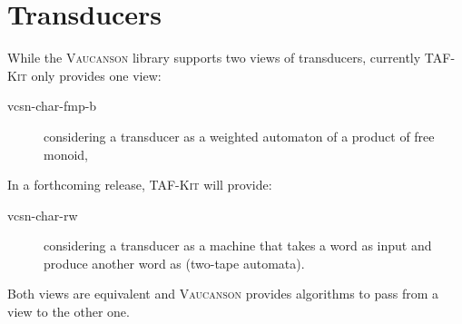 \documentclass[a4paper]{report}
\newcommand{\tafkit}{\textsc{TAF-Kit}\xspace}
\newcommand{\Vauc}{\textsc{Vaucanson}\xspace}
\newenvironment{fnsection}[1]{%
  \renewcommand{\item}[3]{\texttt{##1} \var{##2} & ##3\\}

  \tabularx{\textwidth}{|l|X|}%
    \hline\multicolumn{2}{|c|}{#1} \\\hline%
  }{%
  \endtabularx%
}
\begin{document}

\newpage
\section{Transducers}
\label{sec:vcsn-char-fmp-b}

While the \Vauc library supports two views of transducers, currently
\tafkit only provides one view:

\begin{description}
\item[vcsn-char-fmp-b] considering a transducer as a weighted automaton of a
  product of free monoid,
\end{description}

In a forthcoming release, \tafkit will provide:

\begin{description}
\item[vcsn-char-rw] considering a transducer as a machine that takes a
  word as input and produce another word as (two-tape automata).
\end{description}

Both views are equivalent and \Vauc provides algorithms to pass from a
view to the other one.
\end{document}
